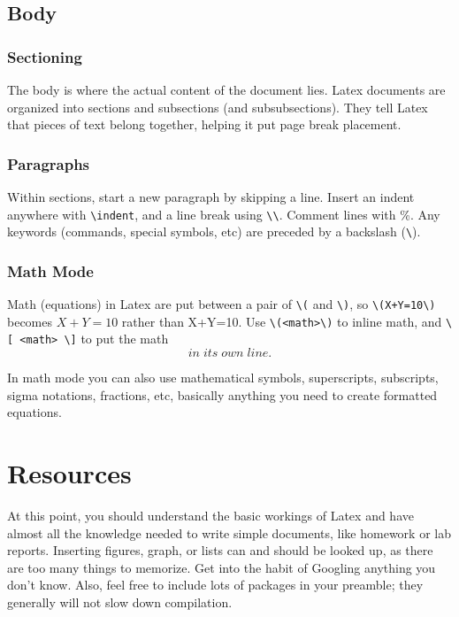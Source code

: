 \documentclass{article}
\newcommand{\bl}{\textbackslash}
\begin{document}
\subsection*{Body}

\subsubsection*{Sectioning}
The body is where the actual content of the document lies. Latex documents are organized into sections and subsections (and subsubsections). They tell Latex that pieces of text belong together, helping it put page break placement. 

\subsubsection*{Paragraphs}
Within sections, start a new paragraph by skipping a line. Insert an indent anywhere with \texttt{\bl indent}, and a line break using \texttt{\bl\bl}. Comment lines with \%. %
Any keywords (commands, special symbols, etc) are preceded by a backslash (\texttt{\bl}).

\subsubsection*{Math Mode}
Math (equations) in Latex are put between a pair of \texttt{\bl(} and \texttt{\bl)}, so \texttt{\bl(X+Y=10\bl)} becomes \(X+Y=10\) rather than X+Y=10. Use \texttt{\bl(<math>\bl)} to inline math, and \texttt{\bl[ <math> \bl]} to put the math 
\[in\; its\; own\; line.\]

In math mode you can also use mathematical symbols, superscripts, subscripts, sigma notations, fractions, etc, basically anything you need to create formatted equations.

\section*{Resources}
At this point, you should understand the basic workings of Latex and have almost all the knowledge needed to write simple documents, like homework or lab reports. Inserting figures, graph, or lists can and should be looked up, as there are too many things to memorize. Get into the habit of Googling anything you don't know. Also, feel free to include lots of packages in your preamble; they generally will not slow down compilation.
\end{document}
